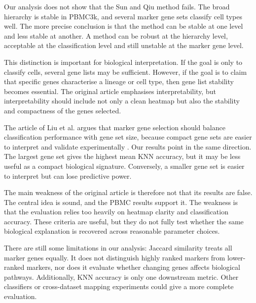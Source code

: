 \documentclass[11pt,a4paper]{article}
\begin{document}
Our analysis does not show that the Sun and Qiu method fails. The broad hierarchy is stable in PBMC3k, and several marker gene sets classify cell types well.
The more precise conclusion is that the method can be stable at one level and less stable at another.
A method can be robust at the hierarchy level, acceptable at the classification level and still unstable at the marker gene level.

This distinction is important for biological interpretation.
If the goal is only to classify cells, several gene lists may be sufficient.
However, if the goal is to claim that specific genes characterise a lineage or cell type, then gene list stability becomes essential.
The original article emphasises interpretability, but interpretability should include not only a clean heatmap but also the stability and compactness of the genes selected.

The article of  Liu et al. argues that marker gene selection should balance classification performance with gene set size, because compact gene sets are easier to interpret and validate experimentally \cite{liu2026}.
Our results point in the same direction.
The largest gene set gives the highest mean KNN accuracy, but it may be less useful as a compact biological signature.
Conversely, a smaller gene set is easier to interpret but can lose predictive power.

The main weakness of the original article is therefore not that its results are false.
The central idea is sound, and the PBMC results support it.
The weakness is that the evaluation relies too heavily on heatmap clarity and classification accuracy.
These criteria are useful, but they do not fully test whether the same biological explanation is recovered across reasonable parameter choices.

There are still some limitations in our analysis: Jaccard similarity treats all marker genes equally.
It does not distinguish highly ranked markers from lower-ranked markers, nor does it evaluate whether changing genes affects biological pathways.
Additionally, KNN accuracy is only one downstream metric.
Other classifiers or cross-dataset mapping experiments could give a more complete evaluation.


\end{document}
